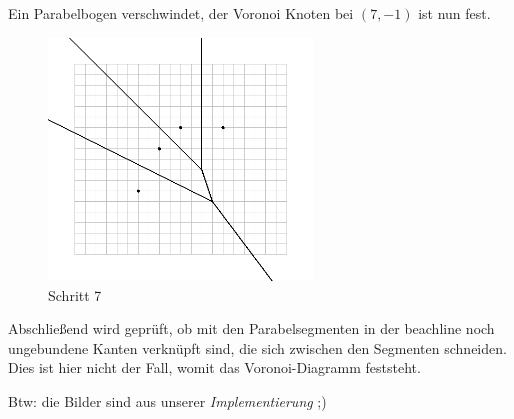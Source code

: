 Ein Parabelbogen verschwindet, der Voronoi Knoten bei $(7,-1)$ ist nun fest.

\newpage

\begin{figure}[h]
\begin{center}
\includegraphics[width=7cm]{capture7}
\end{center}
\caption{Schritt 7}
\label{fig:c7}
\end{figure}

Abschließend wird geprüft, ob mit den Parabelsegmenten in der beachline noch ungebundene Kanten verknüpft sind, die sich zwischen den Segmenten schneiden. Dies ist hier nicht der Fall, womit das Voronoi-Diagramm feststeht.

Btw: die Bilder sind aus unserer \emph{Implementierung} ;)